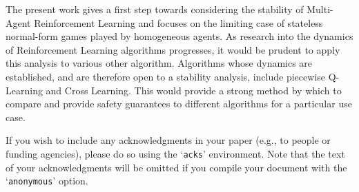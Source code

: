 \documentclass[sigconf,anonymous]{aamas}
\begin{document}
The present work gives a first step towards considering the stability
of Multi-Agent Reinforcement Learning and focuses on the limiting case
of stateless normal-form games played by homogeneous agents. As
research into the dynamics of Reinforcement Learning algorithms
progresses, it would be prudent to apply this analysis to various
other algorithm. Algorithms whose dynamics are established, and are
therefore open to a stability analysis, include piecewise Q-Learning
and Cross Learning. This would provide a strong method by which to
compare and provide safety guarantees to different algorithms for a
particular use case.



\begin{acks}
If you wish to include any acknowledgments in your paper (e.g., to 
people or funding agencies), please do so using the `\texttt{acks}' 
environment. Note that the text of your acknowledgments will be omitted
if you compile your document with the `\texttt{anonymous}' option.
\end{acks}



 


\end{document}
